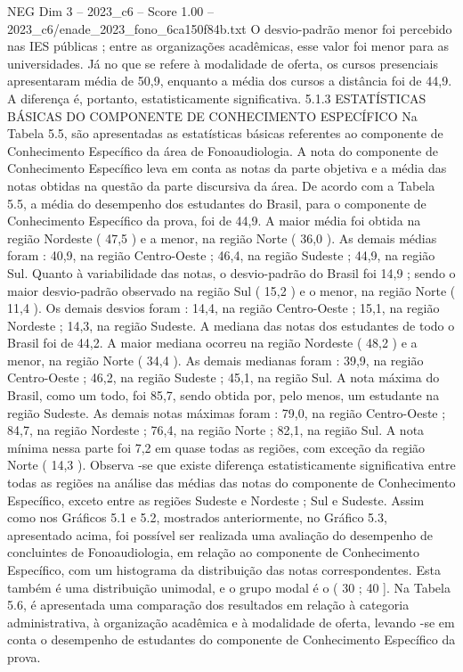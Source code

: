 \begin{textsample}{NEG Dim 3 – 2023\_c6 – Score 1.00 – 2023\_c6/enade\_2023\_fono\_6ca150f84b.txt}
O desvio-padrão menor foi percebido nas IES públicas ; entre as organizações acadêmicas, esse valor foi menor para as universidades.
Já no que se refere à modalidade de oferta, os cursos presenciais apresentaram média de 50,9, enquanto a média dos cursos a distância foi de 44,9.
A diferença é, portanto, estatisticamente significativa. 5.1.3 ESTATÍSTICAS BÁSICAS DO COMPONENTE DE CONHECIMENTO ESPECÍFICO Na Tabela 5.5, são apresentadas as estatísticas básicas referentes ao componente de Conhecimento Específico da área de Fonoaudiologia.
A nota do componente de Conhecimento Específico leva em conta as notas da parte objetiva e a média das notas obtidas na questão da parte discursiva da área.
De acordo com a Tabela 5.5, a média do desempenho dos estudantes do Brasil, para o componente de Conhecimento Específico da prova, foi de 44,9.
A maior média foi obtida na região Nordeste ( 47,5 ) e a menor, na região Norte ( 36,0 ).
As demais médias foram : 40,9, na região Centro-Oeste ; 46,4, na região Sudeste ; 44,9, na região Sul.
Quanto à variabilidade das notas, o desvio-padrão do Brasil foi 14,9 ; sendo o maior desvio-padrão observado na região Sul ( 15,2 ) e o menor, na região Norte ( 11,4 ).
Os demais desvios foram : 14,4, na região Centro-Oeste ; 15,1, na região Nordeste ; 14,3, na região Sudeste.
A mediana das notas dos estudantes de todo o Brasil foi de 44,2.
A maior mediana ocorreu na região Nordeste ( 48,2 ) e a menor, na região Norte ( 34,4 ).
As demais medianas foram : 39,9, na região Centro-Oeste ; 46,2, na região Sudeste ; 45,1, na região Sul.
A nota máxima do Brasil, como um todo, foi 85,7, sendo obtida por, pelo menos, um estudante na região Sudeste.
As demais notas máximas foram : 79,0, na região Centro-Oeste ; 84,7, na região Nordeste ; 76,4, na região Norte ; 82,1, na região Sul.
A nota mínima nessa parte foi 7,2 em quase todas as regiões, com exceção da região Norte ( 14,3 ).
Observa -se que existe diferença estatisticamente significativa entre todas as regiões na análise das médias das notas do componente de Conhecimento Específico, exceto entre as regiões Sudeste e Nordeste ; Sul e Sudeste.
Assim como nos Gráficos 5.1 e 5.2, mostrados anteriormente, no Gráfico 5.3, apresentado acima, foi possível ser realizada uma avaliação do desempenho de concluintes de Fonoaudiologia, em relação ao componente de Conhecimento Específico, com um histograma da distribuição das notas correspondentes.
Esta também é uma distribuição unimodal, e o grupo modal é o ( 30 ; 40 ].
Na Tabela 5.6, é apresentada uma comparação dos resultados em relação à categoria administrativa, à organização acadêmica e à modalidade de oferta, levando -se em conta o desempenho de estudantes do componente de Conhecimento Específico da prova.

\end{textsample}
